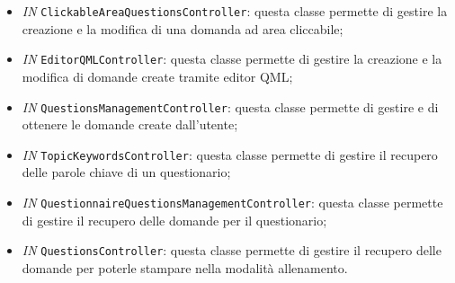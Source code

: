 \begin{itemize}
\begin{itemize}
		\item \textit{IN} \texttt{ClickableAreaQuestionsController}: questa classe permette di gestire la creazione e la modifica di una domanda ad area cliccabile;
		\item \textit{IN} \texttt{EditorQMLController}: questa classe permette di gestire la creazione e la modifica di domande create tramite editor QML;
		\item \textit{IN} \texttt{QuestionsManagementController}: questa classe permette di gestire e di ottenere le domande create dall'utente;
		\item \textit{IN} \texttt{TopicKeywordsController}: questa classe permette di gestire il recupero delle parole chiave di un questionario;
		\item \textit{IN} \texttt{QuestionnaireQuestionsManagementController}: questa classe permette di gestire il recupero delle domande per il questionario;
		\item \textit{IN} \texttt{QuestionsController}: questa classe permette di gestire il recupero delle domande per poterle stampare nella modalità allenamento.
		

\end{itemize}
\end{itemize}
